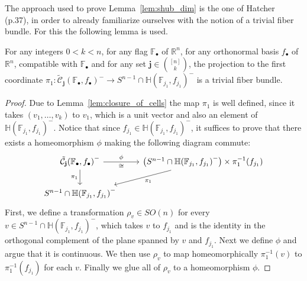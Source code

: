 The approach used to prove Lemma~\ref{lem:shub_dim} is the one of Hatcher~\cite{vec_bundles} (p.37), in order to already familiarize ourselves with the notion of a trivial fiber bundle. For this the following lemma is used.
\begin{lemma}\label{lem:trivial_fb} For any integers $0<k<n$, for any flag $\mathbb{F}_{\bullet}$ of $\mathbb{R}^n$, for any orthonormal basis $f_{\bullet}$ of $\mathbb{R}^n$, compatible with $\mathbb{F}_{\bullet}$ and for any set $\mathbf{j}\in\binom{[n]}{k}$, the projection to the first coordinate
$\pi_1:\tilde{\mathcal{C}}_{\mathbf{j}}{\left(\mathbb{F}_{\bullet},f_{\bullet}\right)}^-\to S^{n-1}\cap\mathbb{H}{\left(\mathbb{F}_{j_1},f_{j_1}\right)}^-$
is a trivial fiber bundle.
\end{lemma}
\begin{proof} Due to Lemma~\ref{lem:closure_of_cells} the map $\pi_1$ is well defined, since it takes $(v_1,\ldots,v_k)$ to $v_1$, which is a unit vector and also an element of $\mathbb{H}{\left(\mathbb{F}_{j_1},f_{j_1}\right)}^-$. Notice that since $f_{j_1}\in\mathbb{H}{\left(\mathbb{F}_{j_1},f_{j_1}\right)}^-$, it suffices to prove that there exists a homeomorphism $\phi$ making the following diagram commute:
\begin{equation}\label{eq:phi_for_trivial}
\begin{tikzcd}
\tilde{\mathcal{C}}_{\mathbf{j}}{\left(\mathbb{F}_{\bullet},f_{\bullet}\right)}^-\ar[r,"\phi","\cong"']\ar[d,"\pi_1"']&\big(S^{n-1}\cap\mathbb{H}{\left(\mathbb{F}_{j_1},f_{j_1}\right)}^-\big)\times\pi_1^{-1}(f_{j_1})\ar[dl,"\pi_1"]\\
S^{n-1}\cap\mathbb{H}{\left(\mathbb{F}_{j_1},f_{j_1}\right)}^-
\end{tikzcd}
\end{equation}
First, we define a transformation $\rho_{v}\in SO(n)$ for every $v\in S^{n-1}\cap\mathbb{H}{\left(\mathbb{F}_{j_1},f_{j_1}\right)}^-$, which takes $v$ to $f_{j_1}$ and is the identity in the orthogonal complement of the plane spanned by $v$ and $f_{j_1}$. Next we define $\phi$ and argue that it is continuous. We then use $\rho_{v}$ to map homeomorphically $\pi_1^{-1}(v)$ to $\pi_1^{-1}(f_{j_1})$ for each $v$. Finally we glue all of $\rho_v$ to a homeomorphism $\phi$.


\end{proof}
